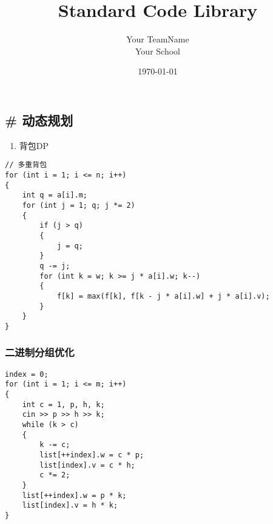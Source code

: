 \documentclass[]{article}
\date{}
\title{\vspace{50mm} \huge Standard Code Library \\[20pt]}
\author{Your TeamName \\[10pt] Your School}
\date{\today}
\providecommand{\tightlist}{%
  \setlength{\itemsep}{0pt}\setlength{\parskip}{0pt}}
\begin{document}
\begin{titlepage}

\maketitle

\end{titlepage}

\newpage

\renewcommand\labelitemi{$\bullet$}

{
\setcounter{tocdepth}{3}
\tableofcontents
\newpage
}








\hypertarget{ux52a8ux6001ux89c4ux5212}{%
\subsection{\# 动态规划}\label{ux52a8ux6001ux89c4ux5212}}

\begin{enumerate}
\def\labelenumi{\arabic{enumi}.}
\tightlist
\item
  背包DP
\end{enumerate}

\begin{verbatim}
// 多重背包
for (int i = 1; i <= n; i++)
{
    int q = a[i].m;
    for (int j = 1; q; j *= 2)
    {
        if (j > q)
        {
            j = q;
        }
        q -= j;
        for (int k = w; k >= j * a[i].w; k--)
        {
            f[k] = max(f[k], f[k - j * a[i].w] + j * a[i].v);
        }
    }
}
\end{verbatim}

\hypertarget{ux4e8cux8fdbux5236ux5206ux7ec4ux4f18ux5316}{%
\subsubsection{二进制分组优化}\label{ux4e8cux8fdbux5236ux5206ux7ec4ux4f18ux5316}}

\begin{verbatim}
index = 0;
for (int i = 1; i <= m; i++)
{
    int c = 1, p, h, k;
    cin >> p >> h >> k;
    while (k > c)
    {
        k -= c;
        list[++index].w = c * p;
        list[index].v = c * h;
        c *= 2;
    }
    list[++index].w = p * k;
    list[index].v = h * k;
}
\end{verbatim}
\end{document}
